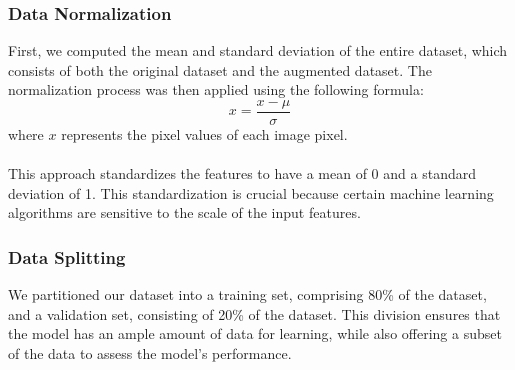 	\subsubsection{Data Normalization}
	First, we computed the mean and standard deviation of the entire dataset, which consists of both the original dataset and the augmented dataset. The normalization process was then applied using the following formula:
	\begin{equation}
	x = \frac{x - \mu}{\sigma}
	\end{equation}
	where \(x\) represents the pixel values of each image pixel. \\\\
	This approach standardizes the features to have a mean of 0 and a standard deviation of 1. This standardization is crucial because certain machine learning algorithms are sensitive to the scale of the input features.

	\pagebreak
    \subsubsection{Data Splitting}
        We partitioned our dataset into a training set, comprising 80\% of the dataset, and a validation set, consisting of 20\% of the dataset. This division ensures that the model has an ample amount of data for learning, while also offering a subset of the data to assess the model's performance.

